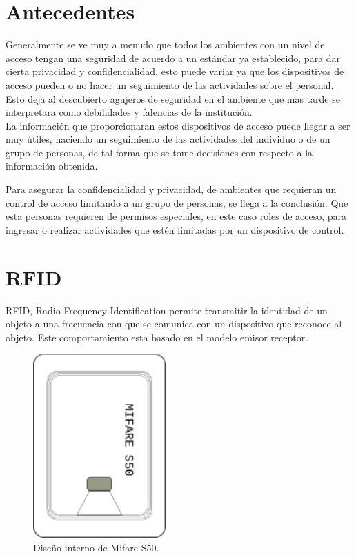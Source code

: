 \documentclass[11pt,twocolumn]{article}
\begin{document}
\section{Antecedentes}

Generalmente se ve muy a menudo que todos los ambientes  con un nivel de acceso tengan una seguridad de acuerdo a un est\'andar ya establecido, para dar cierta privacidad y confidencialidad, esto puede variar ya que los dispositivos de acceso pueden o no hacer un seguimiento de las actividades sobre el personal. Esto deja al descubierto agujeros de seguridad en el ambiente que mas tarde se interpretara como debilidades y falencias de la instituci\'on.\\

La  informaci\'on  que proporcionaran estos dispositivos de acceso puede llegar a ser muy \'utiles, haciendo un seguimiento de las actividades del individuo o de un grupo de personas, de tal forma  que se tome decisiones con respecto a la informaci\'on obtenida.
 

Para asegurar la confidencialidad y privacidad, de ambientes que requieran un control de acceso limitando a un grupo de personas, se llega a la conclusi\'on: Que esta personas  requieren de permisos especiales, en este caso roles de acceso, para ingresar o realizar actividades que est\'en limitadas por un dispositivo de control. \\


\section{RFID}

RFID, Radio Frequency Identification permite transmitir la identidad de un objeto a una frecuencia con que se comunica con un dispositivo que reconoce al objeto. Este comportamiento esta basado en el modelo emisor receptor. \\


\begin{figure}[t]
  \begin{center}
    \includegraphics[width=2in]{mifare.png}
  \end{center}

  \caption{\small Dise\~no interno de Mifare S50.}
  \label{fig-label}
\end{figure}
\end{document}
